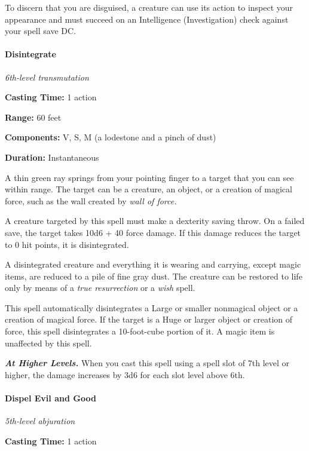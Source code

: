 \documentclass[
]{article}
\begin{document}
To discern that you are disguised, a creature can use its action to
inspect your appearance and must succeed on an Intelligence
(Investigation) check against your spell save DC.

\hypertarget{disintegrate}{%
\paragraph{Disintegrate}\label{disintegrate}}

\emph{6th-level transmutation}

\textbf{Casting Time:} 1 action

\textbf{Range:} 60 feet

\textbf{Components:} V, S, M (a lodestone and a pinch of dust)

\textbf{Duration:} Instantaneous

A thin green ray springs from your pointing finger to a target that you
can see within range. The target can be a creature, an object, or a
creation of magical force, such as the wall created by \emph{wall of
force.}

A creature targeted by this spell must make a dexterity saving throw. On
a failed save, the target takes 10d6 + 40 force damage. If this damage
reduces the target to 0 hit points, it is disintegrated.

A disintegrated creature and everything it is wearing and carrying,
except magic items, are reduced to a pile of fine gray dust. The
creature can be restored to life only by means of a \emph{true
resurrection} or a \emph{wish} spell.

This spell automatically disintegrates a Large or smaller nonmagical
object or a creation of magical force. If the target is a Huge or larger
object or creation of force, this spell disintegrates a 10-foot-cube
portion of it. A magic item is unaffected by this spell.

\emph{\textbf{At Higher Levels.}} When you cast this spell using a spell
slot of 7th level or higher, the damage increases by 3d6 for each slot
level above 6th.

\hypertarget{dispel-evil-and-good}{%
\paragraph{Dispel Evil and Good}\label{dispel-evil-and-good}}

\emph{5th-level abjuration}

\textbf{Casting Time:} 1 action
\end{document}
